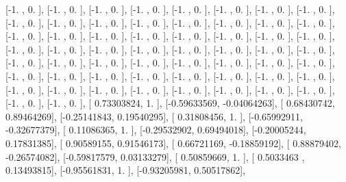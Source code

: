 \documentclass{article}
\begin{document}
       [-1.        ,  0.        ],
       [-1.        ,  0.        ],
       [-1.        ,  0.        ],
       [-1.        ,  0.        ],
       [-1.        ,  0.        ],
       [-1.        ,  0.        ],
       [-1.        ,  0.        ],
       [-1.        ,  0.        ],
       [-1.        ,  0.        ],
       [-1.        ,  0.        ],
       [-1.        ,  0.        ],
       [-1.        ,  0.        ],
       [-1.        ,  0.        ],
       [-1.        ,  0.        ],
       [-1.        ,  0.        ],
       [-1.        ,  0.        ],
       [-1.        ,  0.        ],
       [-1.        ,  0.        ],
       [-1.        ,  0.        ],
       [-1.        ,  0.        ],
       [-1.        ,  0.        ],
       [-1.        ,  0.        ],
       [-1.        ,  0.        ],
       [-1.        ,  0.        ],
       [-1.        ,  0.        ],
       [-1.        ,  0.        ],
       [-1.        ,  0.        ],
       [-1.        ,  0.        ],
       [-1.        ,  0.        ],
       [-1.        ,  0.        ],
       [-1.        ,  0.        ],
       [-1.        ,  0.        ],
       [-1.        ,  0.        ],
       [-1.        ,  0.        ],
       [-1.        ,  0.        ],
       [-1.        ,  0.        ],
       [-1.        ,  0.        ],
       [-1.        ,  0.        ],
       [-1.        ,  0.        ],
       [-1.        ,  0.        ],
       [-1.        ,  0.        ],
       [-1.        ,  0.        ],
       [-1.        ,  0.        ],
       [-1.        ,  0.        ],
       [-1.        ,  0.        ],
       [-1.        ,  0.        ],
       [-1.        ,  0.        ],
       [-1.        ,  0.        ],
       [-1.        ,  0.        ],
       [-1.        ,  0.        ],
       [-1.        ,  0.        ],
       [-1.        ,  0.        ],
       [-1.        ,  0.        ],
       [-1.        ,  0.        ],
       [-1.        ,  0.        ],
       [-1.        ,  0.        ],
       [-1.        ,  0.        ],
       [-1.        ,  0.        ],
       [ 0.73303824,  1.        ],
       [-0.59633569, -0.04064263],
       [ 0.68430742,  0.89464269],
       [-0.25141843,  0.19540295],
       [ 0.31808456,  1.        ],
       [-0.65992911, -0.32677379],
       [ 0.11086365,  1.        ],
       [-0.29532902,  0.69494018],
       [-0.20005244,  0.17831385],
       [ 0.90589155,  0.91546173],
       [ 0.66721169, -0.18859192],
       [ 0.88879402, -0.26574082],
       [-0.59817579,  0.03133279],
       [ 0.50859669,  1.        ],
       [ 0.5033463 ,  0.13493815],
       [-0.95561831,  1.        ],
       [-0.93205981,  0.50517862],
\end{document}
